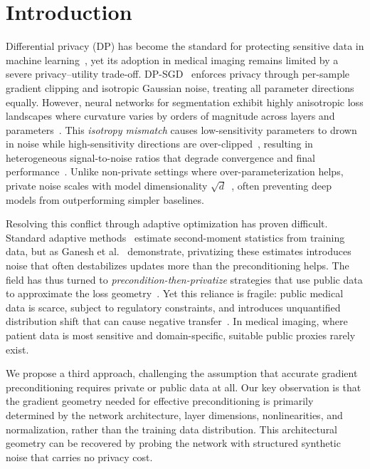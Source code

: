 \documentclass[runningheads]{llncs}
\begin{document}
\section{Introduction}
\label{sec:intro}

Differential privacy (DP) has become the standard for protecting sensitive data in machine learning~\cite{Dwork2006,Dwork2014}, yet its adoption in medical imaging remains limited by a severe privacy--utility trade-off. DP-SGD~\cite{Abadi_2016} enforces privacy through per-sample gradient clipping and isotropic Gaussian noise, treating all parameter directions equally. However, neural networks for segmentation exhibit highly anisotropic loss landscapes where curvature varies by orders of magnitude across layers and parameters~\cite{Dauphin2014}. This \emph{isotropy mismatch} causes low-sensitivity parameters to drown in noise while high-sensitivity directions are over-clipped~\cite{chen2020understanding}, resulting in heterogeneous signal-to-noise ratios that degrade convergence and final performance~\cite{tramer2021differentially}. Unlike non-private settings where over-parameterization helps, private noise scales with model dimensionality $\sqrt{d}$~\cite{bassily2014}, often preventing deep models from outperforming simpler baselines.

Resolving this conflict through adaptive optimization has proven difficult. Standard adaptive methods~\cite{kingma2017adam} estimate second-moment statistics from training data, but as Ganesh et al.~\cite{ganesh2025} demonstrate, privatizing these estimates introduces noise that often destabilizes updates more than the preconditioning helps. The field has thus turned to \emph{precondition-then-privatize} strategies that use public data to approximate the loss geometry~\cite{Amid2022,Li2022}. Yet this reliance is fragile: public medical data is scarce, subject to regulatory constraints, and introduces unquantified distribution shift that can cause negative transfer~\cite{Tramer2024}. In medical imaging, where patient data is most sensitive and domain-specific, suitable public proxies rarely exist.

We propose a third approach, challenging the assumption that accurate gradient preconditioning requires private or public data at all. Our key observation is that the gradient geometry needed for effective preconditioning is primarily determined by the network architecture, layer dimensions, nonlinearities, and normalization, rather than the training data distribution. This architectural geometry can be recovered by probing the network with structured synthetic noise that carries no privacy cost.
\end{document}
